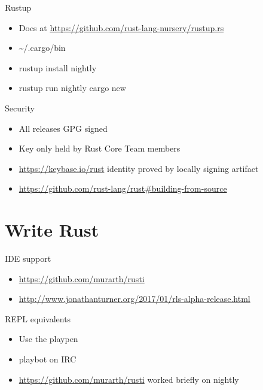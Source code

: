 \documentclass[50pt]{beamer}
\begin{document}
    \begin{frame}
        Rustup
        \begin{itemize}
            \item Docs at \url{https://github.com/rust-lang-nursery/rustup.rs}
            \item \textasciitilde /.cargo/bin
            \item rustup install nightly
            \item rustup run nightly cargo new
        \end{itemize}
    \end{frame}

    \begin{frame}
        Security
        \begin{itemize}
            \item All releases GPG signed
            \item Key only held by Rust Core Team members
            \item \url{https://keybase.io/rust} identity proved by locally signing artifact
            \item \url{https://github.com/rust-lang/rust#building-from-source}
        \end{itemize}
    \end{frame}

\section{Write Rust}

    \begin{frame}
        IDE support
        \begin{itemize}
            \item \url{https://github.com/murarth/rusti}
            \item \url{http://www.jonathanturner.org/2017/01/rls-alpha-release.html}
        \end{itemize}
    \end{frame}

    \begin{frame}
        REPL equivalents
        \begin{itemize}
            \item Use the playpen
            \item playbot on IRC
            \item \url{https://github.com/murarth/rusti} worked briefly on nightly
        \end{itemize}
    \end{frame}
\end{document}

